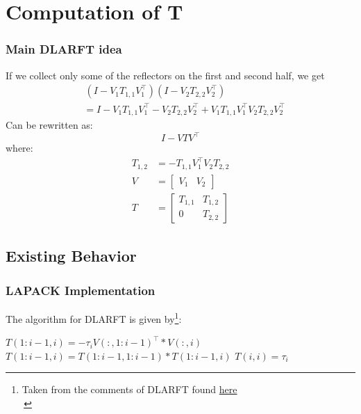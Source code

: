 \documentclass[12pt,aspectratio=169]{beamer}
\begin{document}
    \section{Computation of T}
    \begin{frame}
        \frametitle{Main DLARFT idea}
        If we collect only some of the reflectors on the first and second half, we get
        \begin{align*}
            &\,(I - V_1T_{1,1}V_1^\top)(I - V_2T_{2,2}V_2^\top) \\
            &= I - V_1T_{1,1}V_1^\top - V_2T_{2,2}V_2^\top + V_1T_{1,1}V_1^\top V_2T_{2,2}V_2^\top
        \end{align*}
        Can be rewritten as:
        $$
            I - VTV^\top
        $$
        where:
        \begin{align*}
            T_{1,2} &= -T_{1,1}V_1^\top V_2T_{2,2} \\
            V &= \begin{bmatrix}
                V_1 & V_2
            \end{bmatrix}\\
            T &= \begin{bmatrix}
                T_{1,1} & T_{1,2} \\
                0       & T_{2,2}
            \end{bmatrix}
        \end{align*}
    \end{frame}
    \subsection{Existing Behavior}
    \begin{frame}
        \frametitle{LAPACK Implementation}
        The algorithm for DLARFT is given by\footnote{Taken from the comments of DLARFT found \textcolor{blue}{\href{https://netlib.org/lapack/explore-html//dd/daa/dlarft_8f_source.html}{here}}\\\,}:
        \begin{algorithmic}[1]
                \State $T(1:i-1,i) = -\tau_i V(:,1:i-1)^\top * V(:,i)$
                \State $T(1:i-1,i) = T(1:i-1,1:i-1) * T(1:i-1,i)$
                \State $T(i,i) = \tau_i$
            \EndFor
        \end{algorithmic}

    \end{frame}
\end{document}
